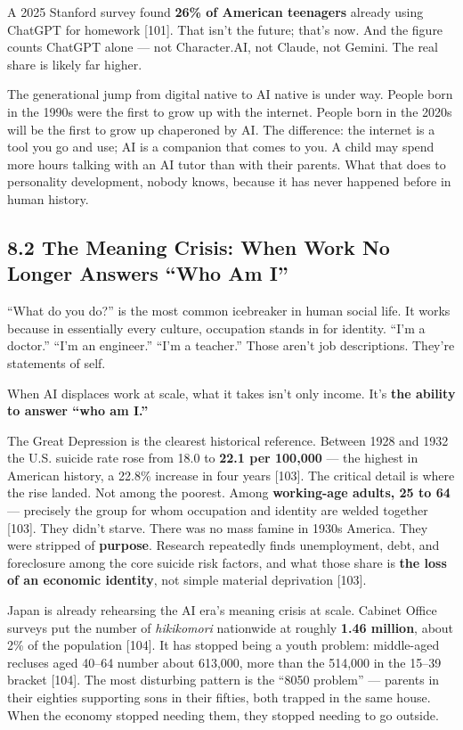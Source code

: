 \documentclass[11pt,a4paper]{article}
\begin{document}
A 2025 Stanford survey found \textbf{26\% of American teenagers} already using ChatGPT for homework [101]. That isn't the future; that's now. And the figure counts ChatGPT alone --- not Character.AI, not Claude, not Gemini. The real share is likely far higher.

The generational jump from digital native to AI native is under way. People born in the 1990s were the first to grow up with the internet. People born in the 2020s will be the first to grow up chaperoned by AI. The difference: the internet is a tool you go and use; AI is a companion that comes to you. A child may spend more hours talking with an AI tutor than with their parents. What that does to personality development, nobody knows, because it has never happened before in human history.

\subsection{8.2 The Meaning Crisis: When Work No Longer Answers ``Who Am I''}

``What do you do?'' is the most common icebreaker in human social life. It works because in essentially every culture, occupation stands in for identity. ``I'm a doctor.'' ``I'm an engineer.'' ``I'm a teacher.'' Those aren't job descriptions. They're statements of self.

When AI displaces work at scale, what it takes isn't only income. It's \textbf{the ability to answer ``who am I.''}

The Great Depression is the clearest historical reference. Between 1928 and 1932 the U.S. suicide rate rose from 18.0 to \textbf{22.1 per 100,000} --- the highest in American history, a 22.8\% increase in four years [103]. The critical detail is where the rise landed. Not among the poorest. Among \textbf{working-age adults, 25 to 64} --- precisely the group for whom occupation and identity are welded together [103]. They didn't starve. There was no mass famine in 1930s America. They were stripped of \textbf{purpose}. Research repeatedly finds unemployment, debt, and foreclosure among the core suicide risk factors, and what those share is \textbf{the loss of an economic identity}, not simple material deprivation [103].

Japan is already rehearsing the AI era's meaning crisis at scale. Cabinet Office surveys put the number of \textit{hikikomori} nationwide at roughly \textbf{1.46 million}, about 2\% of the population [104]. It has stopped being a youth problem: middle-aged recluses aged 40--64 number about 613,000, more than the 514,000 in the 15--39 bracket [104]. The most disturbing pattern is the ``8050 problem'' --- parents in their eighties supporting sons in their fifties, both trapped in the same house. When the economy stopped needing them, they stopped needing to go outside.
\end{document}
